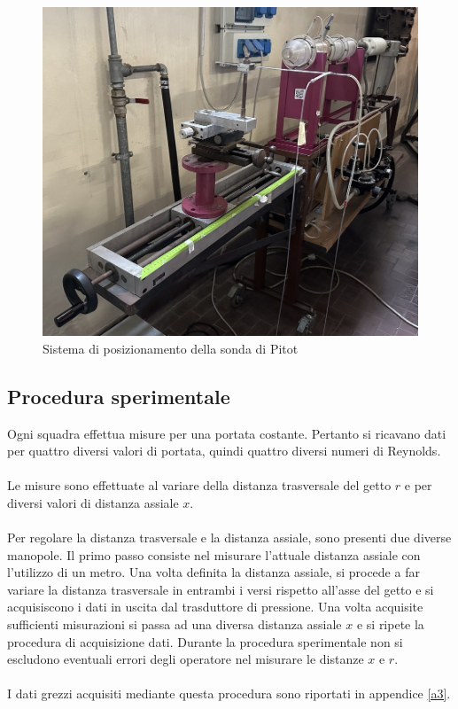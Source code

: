 \begin{figure}[ht]
    \centering
    \includegraphics[width=.85\textwidth]{images/3/gettomanopole.jpg}
    \caption{Sistema di posizionamento della sonda di Pitot}
\end{figure}

\subsection{Procedura sperimentale}
Ogni squadra effettua misure per una portata costante. Pertanto si ricavano dati per quattro diversi valori di portata, quindi quattro diversi numeri di Reynolds.\\\\
Le misure sono effettuate al variare della distanza trasversale del getto $r$ e per diversi valori di distanza assiale $x$.\\\\
Per regolare la distanza trasversale e la distanza assiale, sono presenti due diverse manopole. Il primo passo consiste nel misurare l'attuale distanza assiale con l'utilizzo di un metro. Una volta definita la distanza assiale, si procede a far variare la distanza trasversale in entrambi i versi rispetto all'asse del getto e si acquisiscono i dati in uscita dal trasduttore di pressione. Una volta acquisite sufficienti misurazioni si passa ad una diversa distanza assiale $x$ e si ripete la procedura di acquisizione dati. Durante la procedura sperimentale non si escludono eventuali errori degli operatore nel misurare le distanze $x$ e $r$.\\\\
I dati grezzi acquisiti mediante questa procedura sono riportati in appendice \ref{a3}.

